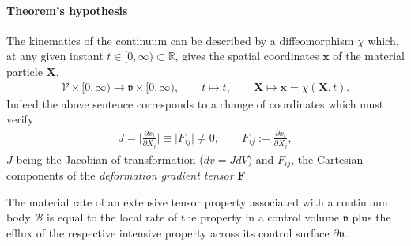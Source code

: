 \paragraph{Theorem's hypothesis}
The kinematics of the continuum can be described by a diffeomorphism
$\chi$ which, at any given instant $t\in [0,\infty)\subset\mathbb{R}$,
  gives the spatial coordinates $\mathbf{x}$ of the material particle
  $\mathbf{X}$,
\begin{align*}
\mathscr{V}\times[0,\infty)\rightarrow \mathfrak{v}\times[0,\infty),
    \qquad t \mapsto t, \qquad
    \mathbf{X}\mapsto\mathbf{x}=\chi(\mathbf{X},t).
\end{align*}
Indeed the above sentence corresponds to a change of coordinates which
must verify
\begin{align*}
J=\bigg\vert\frac{\partial{x}_i}{\partial{X}_j}\bigg\vert\equiv
\big\vert{F_{ij}}\big\vert\neq{0}, \qquad
F_{ij}:=\frac{\partial{x}_i}{\partial{X}_j},
\end{align*}
$J$ being the Jacobian of transformation ($dv=JdV$) and $F_{ij}$, the
Cartesian components of the {\em deformation gradient tensor}
$\mathbf{F}$.

 The material rate of an extensive
tensor property associated with a continuum body $\mathscr{B}$ is
equal to the local rate of the property in a control volume
$\mathfrak{v}$ plus the efflux of the respective intensive property
across its control surface $\partial\mathfrak{v}$.

